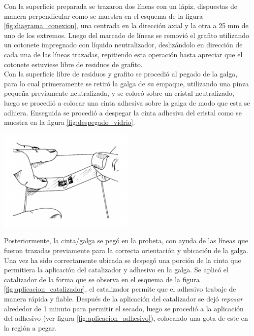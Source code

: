 Con la superficie preparada se trazaron dos líneas con un lápiz, dispuestas de manera perpendicular 
como se muestra en el esquema de la figura \ref{fig:diagrama_conexion}, una centrada en 
la dirección axial y la otra a 25 mm de uno de los extremos. Luego del marcado de líneas 
se removió el grafito utilizando un cotonete impregnado con líquido neutralizador, deslizándolo en 
dirección de cada una de las líneas trazadas, repitiendo esta operación hasta apreciar que 
el cotonete estuviese libre de residuos de grafito. \\


Con la superficie libre de residuos y grafito se procedió al pegado de la galga, para lo cual 
primeramente se retiró la galga de su empaque, utilizando una pinza pequeña previamente neutralizada, 
y se colocó sobre un cristal neutralizado, luego se procedió a colocar una cinta adhesiva sobre la 
galga de modo que esta se adhiera. Enseguida se procedió a despegar la cinta adhesiva del cristal  
como se muestra en la figura \ref{fig:despegado_vidrio}.

\begin{center}
\includegraphics[width=0.5\textwidth]{src/ch3/despegado_vidrio.png}
\label{fig:despegado_vidrio}
\end{center}

Posteriormente, la cinta/galga se pegó en la probeta, con ayuda de las líneas que fueron trazadas previamente 
para la correcta orientación y ubicación de la galga. Una vez ha sido correctamente ubicada se despegó una porción 
de la cinta que permitiera la aplicación del catalizador y adhesivo en la galga. Se aplicó el catalizador 
de la forma que se observa en el esquema de la figura \ref{fig:aplicacion_catalizador}, el catalizador permite 
que el adhesivo trabaje de manera rápida y fiable. Después de la aplicación del catalizador se dejó 
\textit{reposar} alrededor de 1 minuto para permitir el secado, luego se procedió a la aplicación del 
adhesivo (ver figura \ref{fig:aplicacion_adhesivo}), colocando una gota de este en la región a pegar.\\

